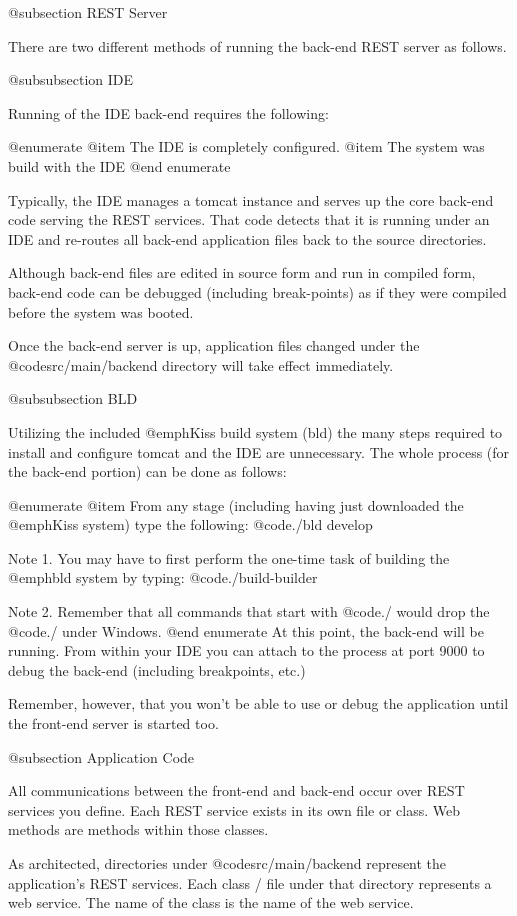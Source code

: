 @subsection REST Server

There are two different methods of running the back-end REST server as
follows.

@subsubsection IDE

Running of the IDE back-end requires the following:

@enumerate
@item
The IDE is completely configured.
@item
The system was build with the IDE
@end enumerate

Typically, the IDE manages a tomcat instance and serves up the core
back-end code serving the REST services.  That code detects that it is
running under an IDE and re-routes all back-end application files back
to the source directories.

Although back-end files are edited in source form and run in compiled
form, back-end code can be debugged (including break-points) as if
they were compiled before the system was booted.

Once the back-end server is up, application files changed under the
@code{src/main/backend} directory will take effect immediately.

@subsubsection BLD

Utilizing the included @emph{Kiss build system (bld)} the many steps required 
to install and configure tomcat and the IDE are unnecessary.  The whole process
(for the back-end portion) can be done as follows:

@enumerate
@item
From any stage (including having just downloaded the @emph{Kiss} system) type
the following:  @code{./bld develop}

Note 1.  You may have to first perform the one-time task of building
the @emph{bld} system by typing: @code{./build-builder}

Note 2.  Remember that all commands that start with @code{./} would drop
the @code{./} under Windows.
@end enumerate
At this point, the back-end will be running.  From within your IDE you
can attach to the process at port 9000 to debug the back-end (including
breakpoints, etc.)

Remember, however, that you won't be able to use or debug the application until
the front-end server is started too.

@subsection Application Code

All communications between the front-end and back-end occur over REST
services you define.  Each REST service exists in its own
file or class.  Web methods are methods within those classes.

As architected, directories under @code{src/main/backend}
represent the application's REST services.  Each class / file under that
directory represents a web service.  The name of the class is the name
of the web service.

